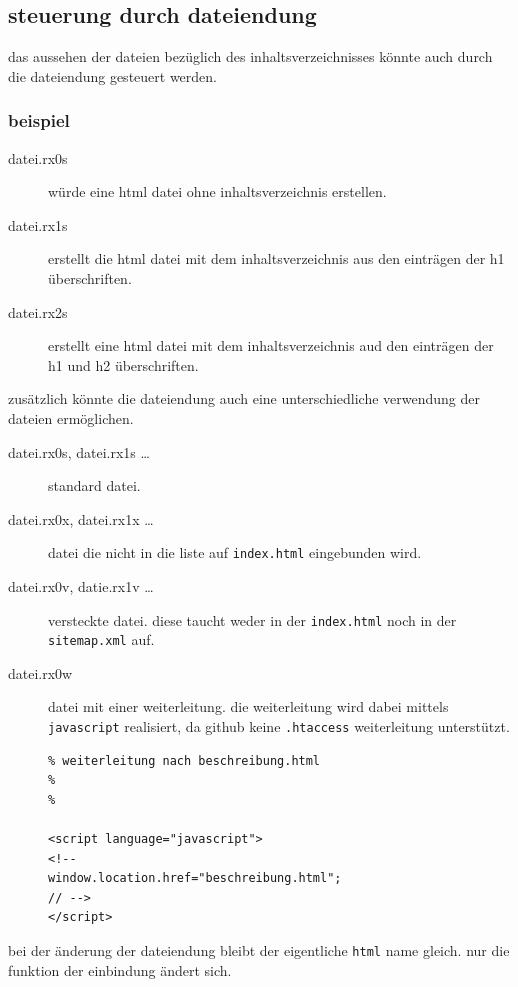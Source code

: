\subsection{steuerung durch
dateiendung}\label{steuerung-durch-dateiendung}

das aussehen der dateien bezüglich des inhaltsverzeichnisses könnte auch
durch die dateiendung gesteuert werden.

\subsubsection{beispiel}\label{beispiel}

\begin{description}
\item[datei.rx0s]
würde eine html datei ohne inhaltsverzeichnis erstellen.
\item[datei.rx1s]
erstellt die html datei mit dem inhaltsverzeichnis aus den einträgen der
h1 überschriften.
\item[datei.rx2s]
erstellt eine html datei mit dem inhaltsverzeichnis aud den einträgen
der h1 und h2 überschriften.
\end{description}

zusätzlich könnte die dateiendung auch eine unterschiedliche verwendung
der dateien ermöglichen.

\begin{description}
\item[datei.rx0s, datei.rx1s \ldots{}]
standard datei.
\item[datei.rx0x, datei.rx1x \ldots{}]
datei die nicht in die liste auf \texttt{index.html} eingebunden wird.
\item[datei.rx0v, datie.rx1v \ldots{}]
versteckte datei. diese taucht weder in der \texttt{index.html} noch in
der \texttt{sitemap.xml} auf.
\item[datei.rx0w]
datei mit einer weiterleitung. die weiterleitung wird dabei mittels
\texttt{javascript} realisiert, da github keine \texttt{.htaccess}
weiterleitung unterstützt.

\begin{verbatim}
% weiterleitung nach beschreibung.html
%
%

<script language="javascript">
<!--
window.location.href="beschreibung.html";
// -->
</script> 
\end{verbatim}
\end{description}

bei der änderung der dateiendung bleibt der eigentliche \texttt{html}
name gleich. nur die funktion der einbindung ändert sich.

